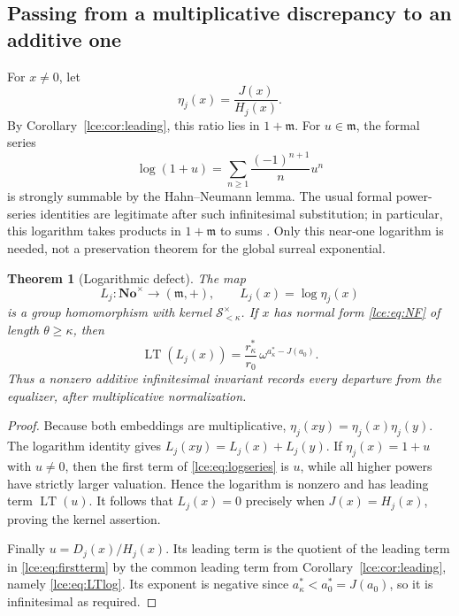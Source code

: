 \documentclass[11pt,letterpaper]{article}
\numberwithin{equation}{section}
\newtheorem{theorem}{Theorem}[section]
\theoremstyle{definition}
\theoremstyle{remark}
\newcommand{\No}{\mathbf{No}}
\newcommand{\LT}{\operatorname{LT}}
\newcommand{\Sk}{\mathscr S_{<\kappa}}
\newcommand{\infideal}{\mathfrak m}
\begin{document}
\subsection{Passing from a multiplicative discrepancy to an additive one}
For $x\ne0$, let
\begin{equation}\label{lce:eq:eta}
 \eta_j(x)=\frac{J(x)}{H_j(x)}.
\end{equation}
By Corollary~\ref{lce:cor:leading}, this ratio lies in $1+\infideal$.
For $u\in\infideal$, the formal series
\begin{equation}\label{lce:eq:logseries}
 \log(1+u)=\sum_{n\ge1}\frac{(-1)^{n+1}}{n}u^n
\end{equation}
is strongly summable by the Hahn--Neumann lemma. The usual formal
power-series identities are legitimate after such infinitesimal
substitution; in particular, this logarithm takes products in
$1+\infideal$ to sums \cite{Gonshor,vdDE}. Only this near-one logarithm
is needed, not a preservation theorem for the global surreal exponential.

\begin{theorem}[Logarithmic defect]\label{lce:thm:logdefect}
The map
\[
 L_j:\No^\times\longrightarrow(\infideal,+),\qquad
 L_j(x)=\log\eta_j(x)
\]
is a group homomorphism with kernel $\Sk^\times$. If $x$ has normal form
\eqref{lce:eq:NF} of length $\theta\ge\kappa$, then
\begin{equation}\label{lce:eq:LTlog}
 \LT(L_j(x))=
   \frac{r^*_{\kappa}}{r_0}\,
       \omega^{a^*_{\kappa}-J(a_0)}.
\end{equation}
Thus a nonzero additive infinitesimal invariant records every departure
from the equalizer, after multiplicative normalization.
\end{theorem}
\begin{proof}
Because both embeddings are multiplicative,
$\eta_j(xy)=\eta_j(x)\eta_j(y)$. The logarithm identity gives
$L_j(xy)=L_j(x)+L_j(y)$.
If $\eta_j(x)=1+u$ with $u\ne0$, then the first term of
\eqref{lce:eq:logseries} is $u$, while all higher powers have strictly larger
valuation. Hence the logarithm is nonzero and has leading term $\LT(u)$.
It follows that $L_j(x)=0$ precisely when $J(x)=H_j(x)$, proving the
kernel assertion.

Finally $u=D_j(x)/H_j(x)$. Its leading term is the quotient of the
leading term in \eqref{lce:eq:firstterm} by the common leading term from
Corollary~\ref{lce:cor:leading}, namely \eqref{lce:eq:LTlog}. Its exponent is
negative since $a^*_{\kappa}<a^*_0=J(a_0)$, so it is infinitesimal as
required.
\end{proof}
\end{document}
